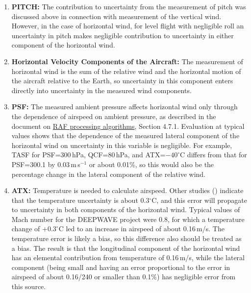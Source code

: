 \documentclass[12pt,twoside,english]{article}\usepackage[]{graphicx}\usepackage[]{color}
\let\OrgIndex\index
\renewcommand*{\index}[1]{\OrgIndex{#1}}
\begin{document}
\begin{enumerate}
\item \textbf{PITCH:} 
The contribution to uncertainty from the measurement of pitch was discussed above in connection with measurement of the vertical wind. However, in the case of horizontal wind, for level flight with negligible roll an uncertainty in pitch makes negligible contribution to uncertainty in either component of the horizontal wind.  
\item \textbf{Horizontal Velocity Components of the Aircraft:} 
The measurement of horizontal wind is the sum of the relative wind and the horizontal motion of the aircraft relative to the Earth, so uncertainty in this component enters directly into uncertainty in the measured wind components.  
\item \textbf{PSF:} 
The measured ambient pressure affects horizontal wind only through the dependence of airspeed on ambient pressure, as described in the document on \href{https://drive.google.com/file/d/0B1kIUH45ca5ATFV5d3QyQ0JpSjA/view?usp=sharing}{RAF processing algorithms}, Section 4.7.1. Evaluation at typical values shows that the dependence of the measured lateral component of the horizontal wind on uncertainty in this variable is negligible. For example, TASF for PSF=300\,hPa, QCF=80\,hPa, and ATX=$-40^{\circ}$C differs from that for PSF=300.1 by 0.03\,m\,s$^{-1}$ or about 0.01\%, so this would also be the percentage change in the lateral component of the relative wind.  
\item \textbf{ATX:} 
Temperature is needed to calculate airspeed. Other studies (\citet{CooperEtAl2014}) indicate that the temperature uncertainty is about 0.3$^{\circ}$C, and this error will propagate to uncertainty in both components of the horizontal wind. Typical values of Mach number for the DEEPWAVE project were 0.8, for which a temperature change of $+0.3^{\circ}$C led to an increase in airspeed of about 0.16\,m/s. The temperature error is likely a bias, so this difference also should be treated as a bias. The result is that the longitudinal component of the horizontal wind has an elemental contribution from temperature of 0.16\,m/s, while the lateral component (being small and having an error proportional to the error in airspeed of about 0.16/240 or smaller than 0.1\%) has negligible error from this source.  

\end{enumerate}
\end{document}
